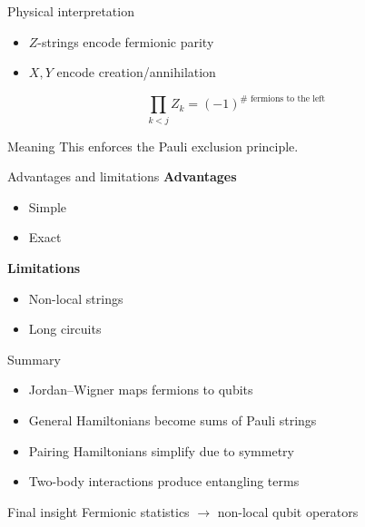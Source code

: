 \documentclass[aspectratio=169]{beamer}
\begin{document}
\begin{frame}{Physical interpretation}
\begin{itemize}
\item $Z$-strings encode fermionic parity
\item $X,Y$ encode creation/annihilation
\end{itemize}

\medskip

\[
\prod_{k<j} Z_k = (-1)^{\text{# fermions to the left}}
\]

\medskip

\begin{block}{Meaning}
This enforces the Pauli exclusion principle.
\end{block}
\end{frame}

\begin{frame}{Advantages and limitations}
\textbf{Advantages}
\begin{itemize}
\item Simple
\item Exact
\end{itemize}

\textbf{Limitations}
\begin{itemize}
\item Non-local strings
\item Long circuits
\end{itemize}
\end{frame}

\begin{frame}{Summary}
\begin{itemize}
\item Jordan--Wigner maps fermions to qubits
\item General Hamiltonians become sums of Pauli strings
\item Pairing Hamiltonians simplify due to symmetry
\item Two-body interactions produce entangling terms
\end{itemize}

\medskip

\begin{block}{Final insight}
Fermionic statistics $\rightarrow$ non-local qubit operators
\end{block}
\end{frame}

\end{document}
